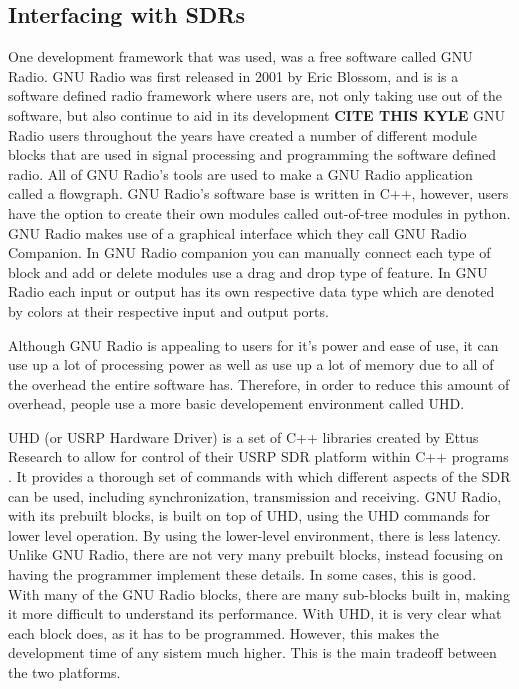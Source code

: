 \subsection{Interfacing with SDRs}
One development framework that was used, was a free software called GNU Radio.  GNU Radio was first released in 2001 by Eric Blossom, and is is a software defined radio framework where users are, not only taking use out of the software, but also continue to aid in its development \textbf{CITE THIS KYLE}%
GNU Radio users throughout the years have created a number of different module blocks that are used in signal processing and programming the software defined radio.  All of GNU Radio’s tools are used to make a GNU Radio application called a flowgraph. GNU Radio’s software base is written in C++, however, users have the option to create their own modules called out-of-tree modules in python.  GNU Radio makes use of a graphical interface which they call GNU Radio Companion.  In GNU Radio companion you can manually connect each type of block and add or delete modules use a drag and drop type of feature.  In GNU Radio each input or output has its own respective data type which are denoted by colors at their respective input and output ports. \par

Although GNU Radio is appealing to users for it's power and ease of use, it can use up a lot of processing power as well as use up a lot of memory due to all of the overhead the entire software has.  Therefore, in order to reduce this amount of overhead, people use a more basic developement environment called UHD.\par

UHD (or USRP Hardware Driver) is a set of C++ libraries created by Ettus Research to allow for control of their USRP SDR platform within C++ programs \cite{uhd_manual}.
It provides a thorough set of commands with which different aspects of the SDR can be used, including synchronization, transmission and receiving.  GNU Radio, with its prebuilt blocks, is built on top of UHD, using the UHD commands for lower level operation. By using the lower-level environment, there is less latency. Unlike GNU Radio, there are not very many prebuilt blocks, instead focusing on having the programmer implement these details. In some cases, this is good. With many of the GNU Radio blocks, there are many sub-blocks built in, making it more difficult to understand its performance. With UHD, it is very clear what each block does, as it has to be programmed. However, this makes the development time of any sistem much higher. This is the main tradeoff between the two platforms.

